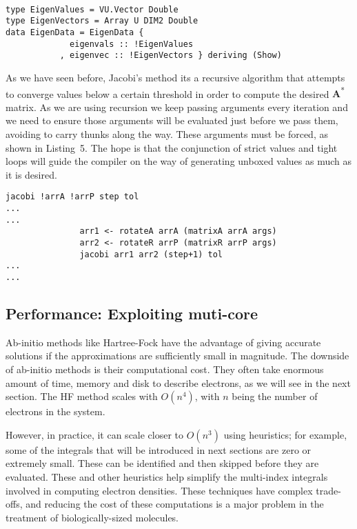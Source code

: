 \documentclass{tmr}
\begin{document}
\begin{lstlisting}[float,captionpos=b,belowcaptionskip=4pt, caption= Strict data types for eigenvalue operations]

type EigenValues = VU.Vector Double
type EigenVectors = Array U DIM2 Double
data EigenData = EigenData {
             eigenvals :: !EigenValues
           , eigenvec :: !EigenVectors } deriving (Show)

\end{lstlisting}

As we have seen before, Jacobi's method its a recursive algorithm that
attempts to converge values below a certain threshold in order to
compute the desired {\textbf A\textsuperscript{*}} matrix.  As we are
using recursion we keep passing arguments every iteration and we need to
ensure those arguments will be evaluated just before we pass them,
avoiding to carry thunks along the way. These arguments must be forced,
as shown in Listing~5. The hope is that the conjunction of strict values
and tight loops will guide the compiler on the way of generating unboxed values as much as it is desired.

\begin{lstlisting}[float,captionpos=b,belowcaptionskip=4pt, caption= Jacobi strict argument passing]
jacobi !arrA !arrP step tol
...
...
               arr1 <- rotateA arrA (matrixA arrA args)
               arr2 <- rotateR arrP (matrixR arrP args)
               jacobi arr1 arr2 (step+1) tol
...
...
\end{lstlisting}

\subsection{Performance: Exploiting muti-core}

Ab-initio methods like Hartree-Fock have the advantage of giving accurate solutions if the approximations 
are sufficiently small in magnitude.
%
The downside of ab-initio methods is their computational cost.
% 
They often take enormous amount of time, 
memory and disk to describe electrons, as we will see in the next section.
%
The HF method scales with $O(n^4)$, with $n$ being
the number of electrons in the system.

However, in practice, it can scale closer to $O(n^3)$ using heuristics;
for example, some of the integrals that will be introduced in next sections are zero or extremely
small. These can be identified and then skipped before they are evaluated. These and other
heuristics help simplify the multi-index integrals involved in computing electron densities.
These techniques have complex trade-offs, and reducing the cost of these computations
is a major problem in the treatment of biologically-sized molecules.
\end{document}

